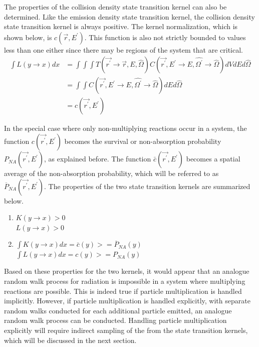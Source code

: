 The properties of the collision density state transition kernel can also be
determined. Like the emission density state transition kernel, the collision
density state transition kernel is always positive. The kernel normalization, 
which is shown below, is $c(\vec{r},E^{'})$. This function is also not strictly 
bounded to values less than one either since there may be regions of the system 
that are critical.
\begin{align}
  \int L(y \to x) dx & = \int\int\int
  T(\vec{r^{'}} \to \vec{r},E,\hat{\Omega})
  C(\vec{r^{'}},E^{'} \to E,\hat{\Omega^{'}} \to \hat{\Omega}) dV dE d\hat{\Omega}
  \nonumber \\
  & = \int\int 
  C(\vec{r^{'}},E^{'} \to E,\hat{\Omega^{'}} \to \hat{\Omega}) dE d\hat{\Omega} 
  \nonumber \\
  & = c(\vec{r^{'}},E^{'})
\end{align}

In the special case where only non-multiplying reactions occur in a system,
the function $c(\vec{r^{'}},E^{'})$ becomes the survival or non-absorption
probability $P_{NA}(\vec{r^{'}},E^{'})$, as explained before. The function
$\bar{c}(\vec{r^{'}},E^{'})$ becomes a spatial average of the non-absorption
probability, which will be referred to as $\overline{P}_{NA}(\vec{r^{'}},E^{'})$. 
The properties of the two state transition kernels are summarized below.
\begin{enumerate}
  \item $K(y \to x) > 0$ \\
    $L(y \to x) > 0$
  \item $\int K(y \to x)dx = \bar{c}(y) >= \overline{P}_{NA}(y)$ \\
    $\int L(y \to x)dx = c(y) >= P_{NA}(y)$
\end{enumerate}

Based on these properties for the two kernels, it would appear that an 
analogue random walk process for radiation is impossible in a system
where multiplying reactions are possible. This is indeed true if particle
multiplication is handled implicitly. However, if particle multiplication is
handled explicitly, with separate random walks conducted for each additional
particle emitted, an analogue random walk process can be conducted. Handling
particle multiplication explicitly will require indirect sampling of the 
from the state transition kernels, which will be discussed in the next section.

